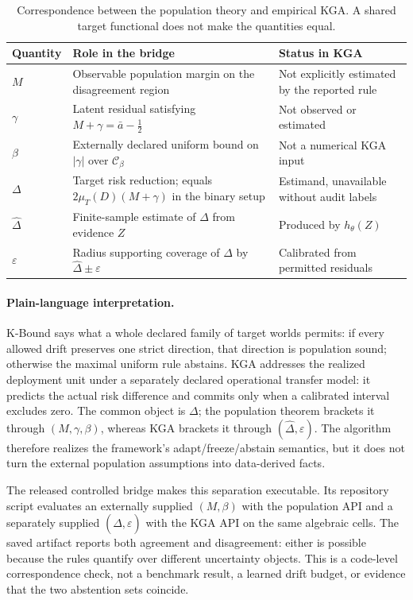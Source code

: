 \begin{table}[t]
\centering
\footnotesize
\caption{Correspondence between the population theory and empirical KGA.  A
shared target functional does not make the quantities equal.}
\label{tab:theory-algorithm-bridge}
\begin{tabular}{@{}p{}p{}p{}@{}}
\toprule
Quantity & Role in the bridge & Status in KGA \\
\midrule
$M$ & Observable population margin on the disagreement region & Not explicitly estimated by the reported rule \\
$\gamma$ & Latent residual satisfying $M+\gamma=\bar a-\tfrac12$ & Not observed or estimated \\
$\beta$ & Externally declared uniform bound on $|\gamma|$ over $\mathcal C_\beta$ & Not a numerical KGA input \\
$\Delta$ & Target risk reduction; equals $2\mu_T(D)(M+\gamma)$ in the binary setup & Estimand, unavailable without audit labels \\
$\widehat\Delta$ & Finite-sample estimate of $\Delta$ from evidence $Z$ & Produced by $h_\theta(Z)$ \\
$\varepsilon$ & Radius supporting coverage of $\Delta$ by $\widehat\Delta\pm\varepsilon$ & Calibrated from permitted residuals \\
\bottomrule
\end{tabular}
\end{table}

\paragraph{Plain-language interpretation.}
K-Bound says what a whole declared family of target worlds permits: if every
allowed drift preserves one strict direction, that direction is population
sound; otherwise the maximal uniform rule abstains.  KGA addresses the realized
deployment unit under a separately declared operational transfer model: it
predicts the actual risk difference and commits only when a calibrated interval
excludes zero.  The common object is $\Delta$; the
population theorem brackets it through $(M,\gamma,\beta)$, whereas KGA brackets
it through $(\widehat\Delta,\varepsilon)$.  The algorithm therefore realizes
the framework's adapt/freeze/abstain semantics, but it does not turn the
external population assumptions into data-derived facts.

The released controlled bridge makes this separation executable.  Its
repository script evaluates an externally supplied
$(M,\beta)$ with the population API and a separately supplied
$(\widehat\Delta,\varepsilon)$ with the KGA API on the same algebraic cells.
The saved artifact reports both agreement and disagreement: either is possible
because the rules quantify over different uncertainty objects.  This is a
code-level correspondence check, not a benchmark result, a learned drift
budget, or evidence that the two abstention sets coincide.

